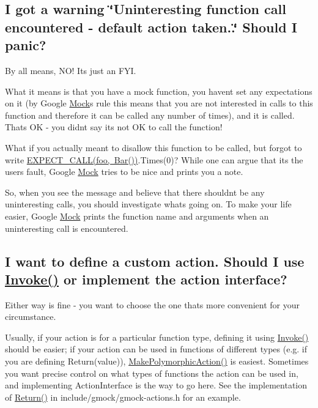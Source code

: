 \subsection*{I got a warning \char`\"{}\+Uninteresting function call encountered -\/ default action taken..\char`\"{} Should I panic?}

By all means, N\+O! It\textquotesingle{}s just an F\+YI.

What it means is that you have a mock function, you haven\textquotesingle{}t set any expectations on it (by Google \mbox{\hyperlink{class_mock}{Mock}}\textquotesingle{}s rule this means that you are not interested in calls to this function and therefore it can be called any number of times), and it is called. That\textquotesingle{}s OK -\/ you didn\textquotesingle{}t say it\textquotesingle{}s not OK to call the function!

What if you actually meant to disallow this function to be called, but forgot to write {\ttfamily \mbox{\hyperlink{_obj__test_2lib_2googletest-release-1_88_81_2googlemock_2include_2gmock_2gmock-spec-builders_8h_a535a6156de72c1a2e25a127e38ee5232}{E\+X\+P\+E\+C\+T\+\_\+\+C\+A\+L\+L(foo, Bar())}}.Times(0)}? While one can argue that it\textquotesingle{}s the user\textquotesingle{}s fault, Google \mbox{\hyperlink{class_mock}{Mock}} tries to be nice and prints you a note.

So, when you see the message and believe that there shouldn\textquotesingle{}t be any uninteresting calls, you should investigate what\textquotesingle{}s going on. To make your life easier, Google \mbox{\hyperlink{class_mock}{Mock}} prints the function name and arguments when an uninteresting call is encountered.

\subsection*{I want to define a custom action. Should I use \mbox{\hyperlink{namespacetesting_af5cacf4475557b5a3e37af3836564235}{Invoke()}} or implement the action interface?}

Either way is fine -\/ you want to choose the one that\textquotesingle{}s more convenient for your circumstance.

Usually, if your action is for a particular function type, defining it using {\ttfamily \mbox{\hyperlink{namespacetesting_af5cacf4475557b5a3e37af3836564235}{Invoke()}}} should be easier; if your action can be used in functions of different types (e.\+g. if you are defining {\ttfamily Return(value)}), {\ttfamily \mbox{\hyperlink{namespacetesting_a45df529b8166936d970884383f0ede82}{Make\+Polymorphic\+Action()}}} is easiest. Sometimes you want precise control on what types of functions the action can be used in, and implementing {\ttfamily Action\+Interface} is the way to go here. See the implementation of {\ttfamily \mbox{\hyperlink{namespacetesting_adae3994eb444d1ad2dd602454b854663}{Return()}}} in {\ttfamily include/gmock/gmock-\/actions.\+h} for an example.

